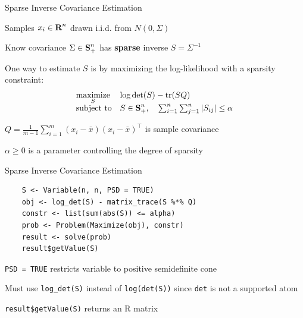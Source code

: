 \documentclass{beamer}
\begin{document}

\begin{frame}{Sparse Inverse Covariance Estimation}
	\BIT
		\item Samples $x_i \in {\mbox{\bf R}}^n$ drawn i.i.d. from $N(0,\Sigma)$
		\item Know covariance $\Sigma \in {\mbox{\bf S}}_+^n$ has \textbf{sparse} inverse $S = \Sigma^{-1}$
		
		\pause
		\item One way to estimate $S$ is by maximizing the log-likelihood with a sparsity constraint:
	\EIT
	\[
		\begin{array}{ll} \underset{S}{\mbox{maximize}} & \log\det(S) - \mbox{tr}(SQ) \\
			\mbox{subject to} & S \in {\mbox{\bf S}}_+^n, \quad \sum_{i=1}^n \sum_{j=1}^n |S_{ij}| \leq \alpha
		\end{array}
	\]
	\BIT
		\item $Q = \frac{1}{m-1}\sum_{i=1}^m (x_i - \bar x)(x_i - \bar x)^{\top}$ is sample covariance
		\item $\alpha \geq 0$ is a parameter controlling the degree of sparsity
	\EIT
\end{frame}

\begin{frame}[fragile]{Sparse Inverse Covariance Estimation}
	\begin{verbatim}
	S <- Variable(n, n, PSD = TRUE)
	obj <- log_det(S) - matrix_trace(S %*% Q)
	constr <- list(sum(abs(S)) <= alpha)
	prob <- Problem(Maximize(obj), constr)
	result <- solve(prob)
	result$getValue(S)
	\end{verbatim}
	\BIT
		\item \verb|PSD = TRUE| restricts variable to positive semidefinite cone
		\item Must use \verb|log_det(S)| instead of \verb|log(det(S))| since \verb|det| is not a supported atom
		\item \verb|result$getValue(S)| returns an R matrix
	\EIT
\end{frame}
\end{document}
